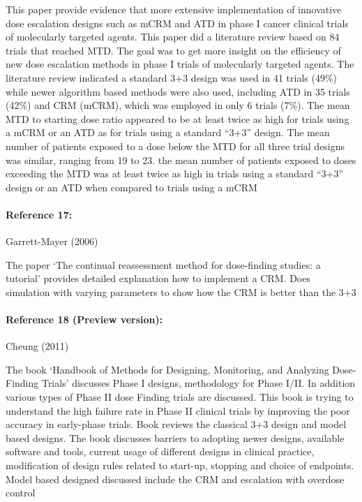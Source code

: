\documentclass[
]{article}
\begin{document}
This paper provide evidence that more extensive implementation of
innovative dose escalation designs such as mCRM and ATD in phase I
cancer clinical trials of molecularly targeted agents. This paper did a
literature review based on 84 trials that reached MTD. The goal was to
get more insight on the efficiency of new dose escalation methods in
phase I trials of molecularly targeted agents. The literature review
indicated a standard 3+3 design was used in 41 trials (49\%) while newer
algorithm based methods were also used, including ATD in 35 trials
(42\%) and CRM (mCRM), which was employed in only 6 trials (7\%). The
mean MTD to starting dose ratio appeared to be at least twice as high
for trials using a mCRM or an ATD as for trials using a standard ``3+3''
design. The mean number of patients exposed to a dose below the MTD for
all three trial designs was similar, ranging from 19 to 23. the mean
number of patients exposed to doses exceeding the MTD was at least twice
as high in trials using a standard ``3+3'' design or an ATD when
compared to trials using a mCRM

\hypertarget{reference-17}{%
\paragraph{Reference 17:}\label{reference-17}}

Garrett-Mayer (2006)

The paper `The continual reassessment method for dose-finding studies: a
tutorial' provides detailed explanation how to implement a CRM. Does
simulation with varying parameters to show how the CRM is better than
the 3+3

\hypertarget{reference-18-preview-version}{%
\paragraph{Reference 18 (Preview
version):}\label{reference-18-preview-version}}

Cheung (2011)

The book `Handbook of Methods for Designing, Monitoring, and Analyzing
Dose-Finding Trials' discusses Phase I designs, methodology for Phase
I/II. In addition various types of Phase II dose Finding trials are
discussed. This book is trying to understand the high failure rate in
Phase II clinical trials by improving the poor accuracy in early-phase
trials. Book reviews the classical 3+3 design and model based designs.
The book discusses barriers to adopting newer designs, available
software and tools, current usage of different designs in clinical
practice, modification of design rules related to start-up, stopping and
choice of endpoints. Model based designed discussed include the CRM and
escalation with overdose control
\end{document}
